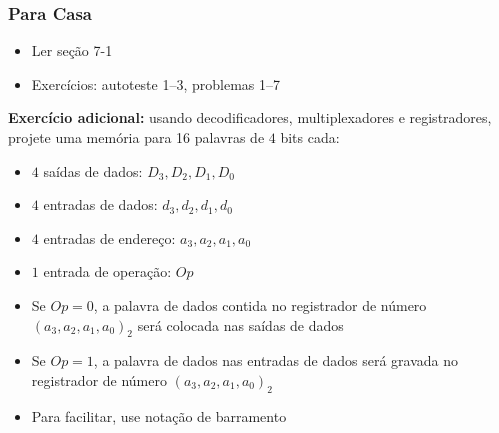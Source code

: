 \documentclass{beamer}
\begin{document}
\begin{frame}
\frametitle{Para Casa}

\begin{itemize}
\item Ler seção 7-1
\item Exercícios: autoteste 1--3, problemas 1--7
\end{itemize}
\pause
\textbf{Exercício adicional:} usando decodificadores, multiplexadores e registradores, projete uma memória para 16 palavras de $4$ bits cada:
\begin{itemize}
\item $4$ saídas de dados: $D_3, D_2, D_1, D_0$
\item $4$ entradas de dados: $d_3, d_2, d_1, d_0$
\item $4$ entradas de endereço: $a_3, a_2, a_1, a_0$
\item $1$ entrada de operação: $Op$ 
\pause
\item Se $Op = 0$, a palavra de dados contida
          no registrador de número $(a_3, a_2, a_1, a_0)_2$ será
          colocada nas saídas de dados
\pause
\item Se $Op = 1$, a palavra de dados nas entradas de dados será
          gravada no registrador de número $(a_3, a_2, a_1, a_0)_2$
\pause
\item Para facilitar, use notação de barramento
\end{itemize}
\end{frame}
\end{document}
